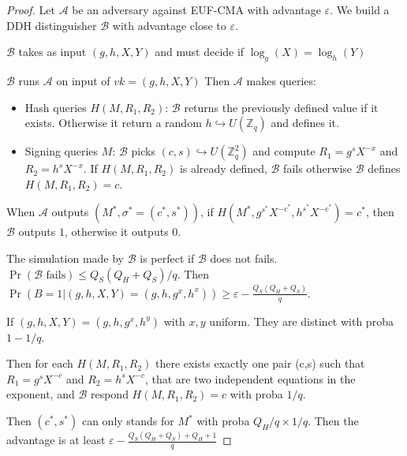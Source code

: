\documentclass{article}
\newcommand{\Z}{\mathbb{Z}}
\newcommand{\A}{\mathcal{A}}
\newcommand{\B}{\mathcal{B}}
\renewcommand{\epsilon}{\varepsilon}
\begin{document}
\begin{proof}
Let $\A$ be an adversary against EUF-CMA with advantage $\epsilon$. We build a DDH distinguisher $\B$ with advantage close to $\epsilon$.

$\B$ takes as input $(g,h,X,Y)$ and must decide if $\log_g(X)=\log_h(Y)$

$\B$ runs $\A$ on input of $vk=(g,h,X,Y)$ Then $\A$ makes queries:

\begin{itemize}
\item Hash queries $H(M,R_1,R_2)$: $\B$ returns the previously defined value if it exists. Otherwise it return a random $h\hookrightarrow U(\Z_q)$ and defines it.

\item Signing queries $M$: $\B$ picks $(c,s)\hookrightarrow U(\Z_q^2)$ and compute $R_1 = g^sX^{-x}$ and  $R_2 = h^sX^{-x}$. If $H(M,R_1,R_2)$ is already defined, $\B$ fails otherwise $\B$ defines $H(M,R_1,R_2)=c$.
\end{itemize}

When $\A$ outputs $(M^*,\sigma^*=(c^*,s^*))$, if $H(M^*,g^{s^*}X^{-c^*},h^{s^*}X^{-c^*})=c^*$, then $\B$ outputs $1$, otherwise it outputs $0$.

The simulation made by $\B$ is perfect if $\B$ does not fails. $\Pr(\B\text{ fails})\leq Q_S(Q_H+Q_S)/q$. Then $\Pr(B=1|(g,h,X,Y)=(g,h,g^x,h^x))\geq \epsilon -\frac{Q_S(Q_H+Q_S)}{q}$.

If $(g,h,X,Y)=(g,h,g^x,h^y)$ with $x,y$ uniform. They are distinct with proba $1-1/q$.

Then for each $H(M,R_1,R_2)$ there exists exactly one pair (c,s) such that $R_1=g^sX^{-c}$ and $R_2=h^sX^{-c}$, that are two independent equations in the exponent, and $\B$ respond $H(M,R_1,R_2)=c$ with proba $1/q$.

Then $(c^*,s^*)$ can only stands for $M^*$ with proba $Q_H/q\times1/q$. Then the advantage is at least $\epsilon -\frac{Q_S(Q_H+Q_S)+Q_H+1}{q}$

\end{proof}
\end{document}
